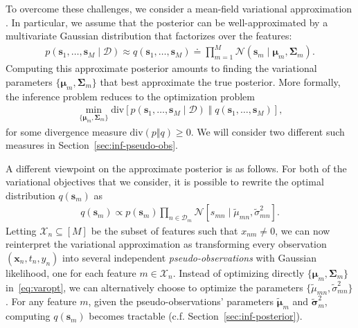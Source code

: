 To overcome these challenges, we consider a mean-field variational approximation \citep{wainwright2008graphical}.
In particular, we assume that the posterior can be well-approximated by a multivariate Gaussian distribution that factorizes over the features:
\begin{align}
\label{eq:approxpost}
p(\bm{s}_1, \ldots, \bm{s}_M \mid \mathcal{D})
    \approx q(\bm{s}_1, \ldots, \bm{s}_M)
    \doteq \prod_{m = 1}^M \mathcal{N}(\bm{s}_m \mid \bm{\mu}_m, \bm{\Sigma}_m).
\end{align}
Computing this approximate posterior amounts to finding the variational parameters $\{\bm{\mu}_m, \bm{\Sigma}_m \}$ that best approximate the true posterior.
More formally, the inference problem reduces to the optimization problem
\begin{align}
\label{eq:varopt}
\min_{\{\bm{\mu}_m, \bm{\Sigma}_m \}} \mathrm{div} \left[ p(\bm{s}_1, \ldots, \bm{s}_M \mid \mathcal{D}) \;\Vert\; q(\bm{s}_1, \ldots, \bm{s}_M) \right],
\end{align}
for some divergence measure $\mathrm{div}(p \Vert q) \ge 0$.
We will consider two different such measures in Section~\ref{sec:inf-pseudo-obs}.

A different viewpoint on the approximate posterior is as follows.
For both of the variational objectives that we consider, it is possible to rewrite the optimal distribution $q(\bm{s}_m)$ as
\begin{align*}
q(\bm{s}_m) \propto p(\bm{s}_m) \prod_{n \in \mathcal{D}_m} \mathcal{N}[s_{mn} \mid \tilde{\mu}_{mn}, \tilde{\sigma}^2_{mn}].
\end{align*}
Letting $\mathcal{X}_n \subseteq [M]$ be the subset of features such that $x_{nm} \ne 0$, we can now reinterpret the variational approximation as transforming every observation $(\bm{x}_n, t_n, y_n)$ into several independent \emph{pseudo-observations} with Gaussian likelihood, one for each feature $m \in \mathcal{X}_n$.
Instead of optimizing directly $\{ \bm{\mu}_m, \bm{\Sigma}_m \}$ in~\eqref{eq:varopt}, we can alternatively choose to optimize the parameters $\{ \tilde{\mu}_{mn}, \tilde{\sigma}^2_{mn} \}$.
For any feature $m$, given the pseudo-observations' parameters $\tilde{\bm{\mu}}_m$ and $\tilde{\bm{\sigma}}_m^2$, computing $q(\bm{s}_m)$ becomes tractable (c.f. Section~\ref{sec:inf-posterior}).

